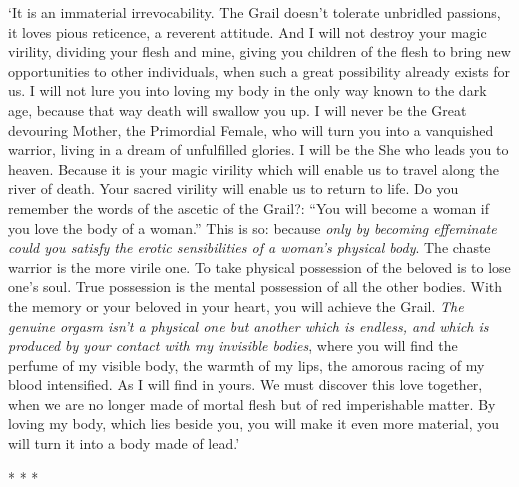\begin{quotationx}
`It is an immaterial irrevocability. The Grail doesn't tolerate unbridled passions, it loves pious reticence, a reverent attitude. And I will not destroy your magic virility, dividing your flesh and mine, giving you children of the flesh to bring new opportunities to other individuals, when such a great possibility already exists for us. I will not lure you into loving my body in the only way known to the dark age, because that way death will swallow you up. I will never be the Great devouring Mother, the Primordial Female, who will turn you into a vanquished warrior, living in a dream of unfulfilled glories. I will be the She who leads you to heaven. Because it is your magic virility which will enable us to travel along the river of death. Your sacred virility will enable us to return to life. Do you remember the words of the ascetic of the Grail?: ``You will become a woman if you love the body of a woman.'' This is so: because \emph{only by becoming effeminate could you satisfy the erotic sensibilities of a woman's physical body}. The chaste warrior is the more virile one. To take physical possession of the beloved is to lose one's soul. True possession is the mental possession of all the other bodies. With the memory or your beloved in your heart, you will achieve the Grail. \emph{The genuine orgasm isn't a physical one but another which is endless, and which is produced by your contact with my invisible bodies}, where you will find the perfume of my visible body, the warmth of my lips, the amorous racing of my blood intensified. As I will find in yours. We must discover this love together, when we are no longer made of mortal flesh but of red imperishable matter. By loving my body, which lies beside you, you will make it even more material, you will turn it into a body made of lead.'

\end{quotationx}



\begin{center}* * *\end{center}

